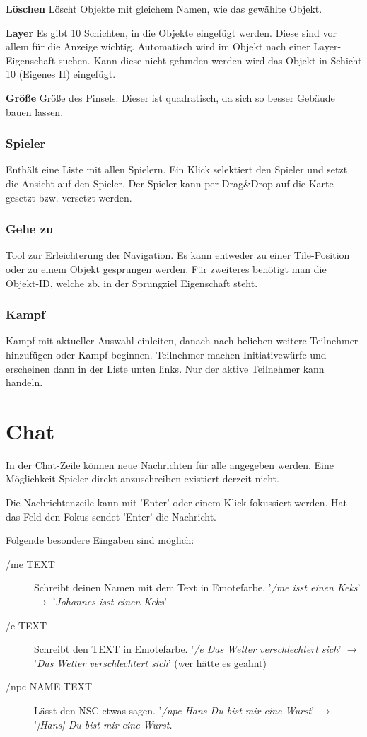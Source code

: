 \documentclass[german,10pt,a4paper,twocolumn,colorscheme=darkblue]{orarticle}
\begin{document}
			\textbf{Löschen} Löscht Objekte mit gleichem Namen, wie das gewählte Objekt.

			\textbf{Layer} Es gibt 10 Schichten, in die Objekte eingefügt werden. Diese sind vor allem für die Anzeige wichtig. Automatisch wird im Objekt nach einer Layer-Eigenschaft suchen. Kann diese nicht gefunden werden wird das Objekt in Schicht 10 (Eigenes II) eingefügt.
			
			\textbf{Größe} Größe des Pinsels. Dieser ist quadratisch, da sich so besser Gebäude bauen lassen.
		
		\subsubsection*{Spieler}
			Enthält eine Liste mit allen Spielern. Ein Klick selektiert den Spieler und setzt die Ansicht auf den Spieler. Der Spieler kann per Drag\&Drop auf die Karte gesetzt bzw. versetzt werden.
		\subsubsection*{Gehe zu}
			Tool zur Erleichterung der Navigation. Es kann entweder zu einer Tile-Position oder zu einem Objekt gesprungen werden. Für zweiteres benötigt man die Objekt-ID, welche zb. in der Sprungziel Eigenschaft steht.
		\subsubsection*{Kampf}
			Kampf mit aktueller Auswahl einleiten, danach nach belieben weitere Teilnehmer hinzufügen oder Kampf beginnen. Teilnehmer machen Initiativewürfe und erscheinen dann in der Liste unten links. Nur der aktive Teilnehmer kann handeln.
		
	\section{Chat}
		In der Chat-Zeile können neue Nachrichten für alle angegeben werden. Eine Möglichkeit Spieler direkt anzuschreiben existiert derzeit nicht.
		
		Die Nachrichtenzeile kann mit 'Enter' oder einem Klick fokussiert werden. Hat das Feld den Fokus sendet 'Enter' die Nachricht.
		
		Folgende besondere Eingaben sind möglich:
		\begin{description}
		\item[/me TEXT] Schreibt deinen Namen mit dem Text in Emotefarbe. '\textit{/me isst einen Keks}' $\rightarrow$ '\textit{Johannes isst einen Keks}'
		\item[/e TEXT] Schreibt den TEXT in Emotefarbe. '\textit{/e Das Wetter verschlechtert sich}' $\rightarrow$ '\textit{Das Wetter verschlechtert sich}' (wer hätte es geahnt)
		 \item[/npc NAME TEXT] Lässt den NSC etwas sagen. '\textit{/npc Hans Du bist mir eine Wurst}' $\rightarrow$ '\textit{[Hans] Du bist mir eine Wurst.}
		\end{description}
	
\end{document}
